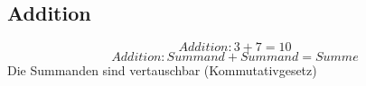 \subsection{Addition}

$$Addition: 3+7=10$$
$$Addition: Summand+Summand=Summe$$
Die Summanden sind vertauschbar (Kommutativgesetz)